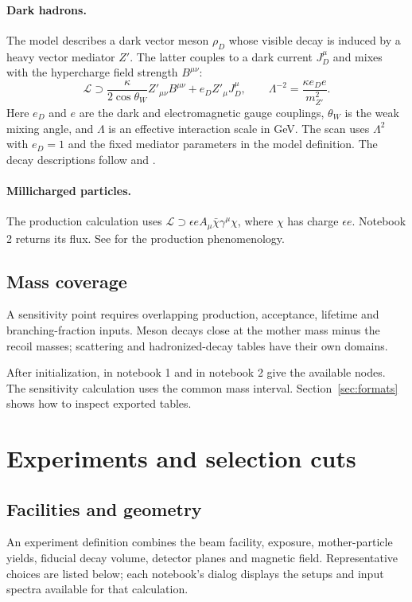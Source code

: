 \paragraph{Dark hadrons.}
The  model describes a dark vector meson $\rho_D$ whose visible decay is induced by a heavy vector mediator $Z'$. The latter couples to a dark current $J_D^\mu$ and mixes with the hypercharge field strength $B^{\mu\nu}$:
\begin{equation}
 \mathcal L\supset\frac{\kappa}{2\cos\theta_W}Z'_{\mu\nu}B^{\mu\nu}
 +e_D Z'_\mu J_D^\mu,
 \qquad \Lambda^{-2}=\frac{\kappa e_D e}{m_{Z'}^2}.
\end{equation}
Here $e_D$ and $e$ are the dark and electromagnetic gauge couplings, $\theta_W$ is the weak mixing angle, and $\Lambda$ is an effective interaction scale in GeV. The scan uses $\Lambda^2$ with $e_D=1$ and the fixed mediator parameters in the model definition. The decay descriptions follow  and .

\paragraph{Millicharged particles.}
The  production calculation uses $\mathcal L\supset\epsilon eA_\mu\bar\chi\gamma^\mu\chi$, where $\chi$ has charge $\epsilon e$. Notebook 2 returns its flux. See  for the production phenomenology.

\subsection{Mass coverage}
A sensitivity point requires overlapping production, acceptance, lifetime and branching-fraction inputs. Meson decays close at the mother mass minus the recoil masses; scattering and hadronized-decay tables have their own domains.

After initialization,  in notebook 1 and  in notebook 2 give the available nodes. The sensitivity calculation uses the common mass interval. Section~\ref{sec:formats} shows how to inspect exported tables.

\section{Experiments and selection cuts}\label{sec:experiments}
\subsection{Facilities and geometry}
An experiment definition combines the beam facility, exposure, mother-particle yields, fiducial decay volume, detector planes and magnetic field. Representative choices are listed below; each notebook's dialog displays the setups and input spectra available for that calculation.

